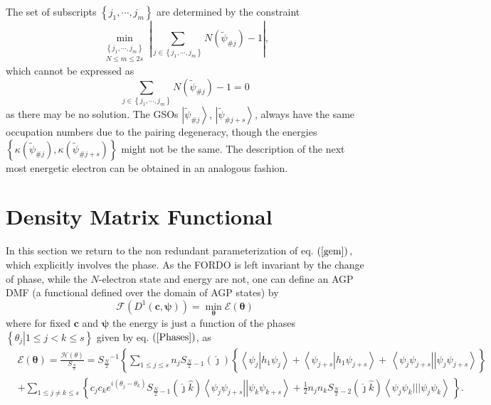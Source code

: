 \documentclass[aps,preprint]{revtex4}%
\begin{document}
The set of subscripts $\left\{  j_{1},\cdots,j_{m}\right\}  $ are determined
by the constraint
\begin{equation}
\min_{\substack{\left\{  j_{1},\cdots,j_{m}\right\}  \\N\leq m\leq
2s}}\left\vert \sum_{j\in\left\{  j_{1},\cdots,j_{m}\right\}  }N\left(
\tilde{\psi}_{\#j}\right)  -1\right\vert , \label{con}%
\end{equation}
which cannot be expressed as
\begin{equation}
\sum_{j\in\left\{  j_{1},\cdots,j_{m}\right\}  }N\left(  \tilde{\psi}%
_{\#j}\right)  -1=0
\end{equation}
as there may be no solution. The GSOs $\left\vert \tilde{\psi}_{\#j}%
\right\rangle $, $\left\vert \tilde{\psi}_{\#j+s}\right\rangle $, always have
the same occupation numbers due to the pairing degeneracy, though the energies
$\left\{  \kappa\left(  \tilde{\psi}_{\#j}\right)  ,\kappa\left(  \tilde{\psi
}_{\#j+s}\right)  \right\}  $ might not be the same. The description of the
next most energetic electron can be obtained in an analogous fashion.

\section{Density Matrix Functional\label{DenMatFun}}

In this section we return to the non redundant parameterization of eq.
$\left(  \ref{gem}\right)  ,$ which explicitly involves the phase. As the
FORDO is left invariant by the change of phase, while the $N$-electron state
and energy are not, one can define an AGP DMF (a functional defined over the
domain of AGP states) by%
\begin{equation}
\mathcal{F}\left(  D^{1}\left(  \boldsymbol{c},\boldsymbol{\psi}\right)
\right)  =\min_{\boldsymbol{\theta}}\mathcal{E}\left(  \boldsymbol{\theta
}\right)
\end{equation}
where for fixed $\boldsymbol{c}$ and $\boldsymbol{\psi}$ the energy is just a
function of the phases $\left\{  \left.  \theta_{j}\right\vert 1\leq j<k\leq
s\right\}  $ given by eq. $\left(  \ref{Phases}\right)  $, as
\begin{align}
&  \mathcal{E}\left(  \boldsymbol{\theta}\right)  =\frac{\mathcal{H}\left(
\theta\right)  }{S_{\frac{N}{2}}}=S_{\frac{N}{2}}{}^{-1}\left\{  \sum_{1\leq
j\leq s}n_{j}S_{\frac{N}{2}-1}\left(  \hat{\jmath}\right)  \left\{  \overset
{}{\left\langle \psi_{j}\left\vert h_{1}\psi_{j}\right.  \right\rangle
+\left\langle \psi_{j+s}\left\vert h_{1}\psi_{j+s}\right.  \right\rangle
}+\,\left\langle \psi_{j}\psi_{j+s}\right\vert \left\vert \psi_{j}\psi
_{j+s}\right\rangle \right\}  \right. \nonumber\\
&  +\sum_{1\leq j\neq k\leq s}\left\{  c_{j}c_{k}e^{i\left(  \theta_{j}%
-\theta_{k}\right)  }S_{\frac{N}{2}-1}\left(  \hat{\jmath}\hat{k}\right)
\left\langle \psi_{j}\psi_{j+s}\right\vert \left\vert \psi_{k}\psi
_{k+s}\right\rangle +\frac{1}{2}n_{j}n_{k}S_{\frac{N}{2}-2}\left(  \hat
{\jmath}\hat{k}\right)  \left\langle \psi_{j}\psi_{k}|||\psi_{j}\psi
_{k}\right\rangle \,\overset{}{}\right\}  .
\end{align}
\end{document}
